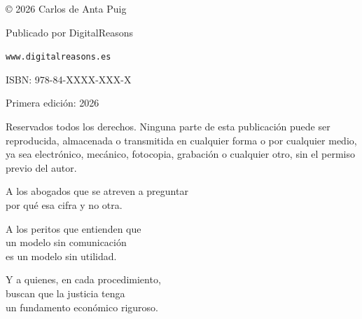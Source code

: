 \thispagestyle{empty}

\vspace*{6cm}

\begin{center}

{\small
© 2026 Carlos de Anta Puig}

\vspace{0.5cm}

{\small
Publicado por DigitalReasons}

\vspace{0.5cm}

{\small
\texttt{www.digitalreasons.es}}

\vspace{1cm}

{\small
ISBN: 978-84-XXXX-XXX-X}

\vspace{0.5cm}

{\small
Primera edición: 2026}

\vspace{0.5cm}

{\small
Reservados todos los derechos. Ninguna parte de esta publicación puede ser reproducida, almacenada o transmitida en cualquier forma o por cualquier medio, ya sea electrónico, mecánico, fotocopia, grabación o cualquier otro, sin el permiso previo del autor.}

\end{center}

\clearpage

\thispagestyle{empty}
\begin{center}
\vspace*{3cm}
{\large\itshape

A los abogados que se atreven a preguntar\\
por qué esa cifra y no otra.\\

\vspace{1cm}

A los peritos que entienden que\\
un modelo sin comunicación\\
es un modelo sin utilidad.\\

\vspace{1cm}

Y a quienes, en cada procedimiento,\\
buscan que la justicia tenga\\
un fundamento económico riguroso.

}
\vspace*{\fill}
\end{center}
\clearpage
